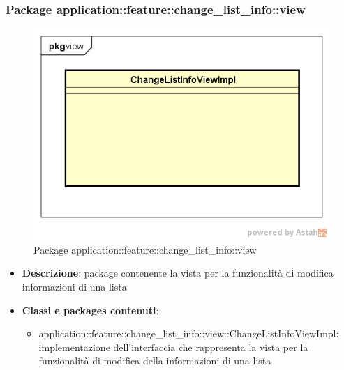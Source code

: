 \subsubsection{Package application::feature::change\_list\_info::view}
\label{Package application::feature::change_list_info::view}
\begin{figure}[H]
	\centering
	\includegraphics[scale=0.5]{Sezioni/Packages/Application/change_list_info_view.png}
	\caption{Package application::feature::change\_list\_info::view}
\end{figure}
\begin{itemize}
	\item \textbf{Descrizione}: package contenente la vista per la funzionalità di modifica informazioni di una lista
	\item \textbf{Classi e packages contenuti}:
	\begin{itemize}
	\item application::feature::change\_list\_info::view::ChangeListInfoViewImpl: implementazione dell'interfaccia che rappresenta la vista per la funzionalità di modifica della informazioni di una lista
	\end{itemize}
\end{itemize}

